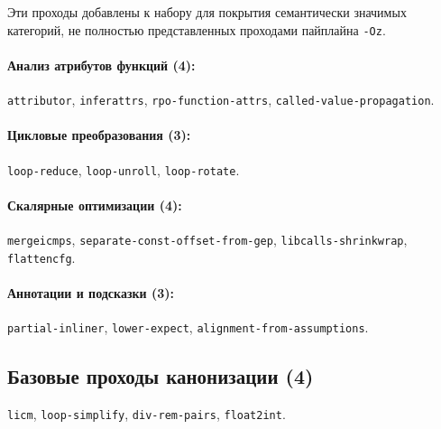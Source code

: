 Эти проходы добавлены к набору для покрытия семантически значимых категорий, не полностью представленных проходами пайплайна \texttt{-Oz}.

\paragraph{Анализ атрибутов функций (4):}
\begin{flushleft}
\texttt{attributor}, \texttt{inferattrs}, \texttt{rpo-\allowbreak function-\allowbreak attrs}, \texttt{called-\allowbreak value-\allowbreak propagation}.
\end{flushleft}

\paragraph{Цикловые преобразования (3):}
\begin{flushleft}
\texttt{loop-\allowbreak reduce}, \texttt{loop-\allowbreak unroll}, \texttt{loop-\allowbreak rotate}.
\end{flushleft}

\paragraph{Скалярные оптимизации (4):}
\begin{flushleft}
\texttt{mergeicmps}, \texttt{separate-\allowbreak const-\allowbreak offset-\allowbreak from-\allowbreak gep}, \texttt{libcalls-\allowbreak shrinkwrap}, \texttt{flattencfg}.
\end{flushleft}

\paragraph{Аннотации и подсказки (3):}
\begin{flushleft}
\texttt{partial-\allowbreak inliner}, \texttt{lower-\allowbreak expect}, \texttt{alignment-\allowbreak from-\allowbreak assumptions}.
\end{flushleft}

\subsection*{Базовые проходы канонизации (4)}

\begin{flushleft}
\texttt{licm}, \texttt{loop-simplify}, \texttt{div-rem-pairs}, \texttt{float2int}.
\end{flushleft}

